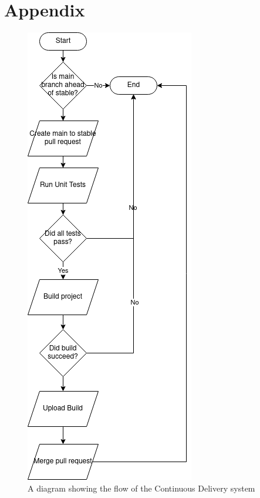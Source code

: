 \documentclass[journal]{IEEEtran}
\begin{document}
\section{Appendix}
\begin{figure}
    \includegraphics[width=0.95\columnwidth]{Images/CD.png}
    \caption{A diagram showing the flow of the Continuous Delivery system}
    \label{CDflow}
\end{figure}
\end{document}
